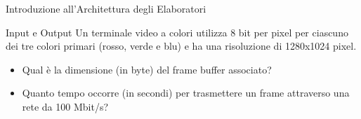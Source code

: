 \documentclass[11pt]{article}
\begin{document}
\begin{quiz}{Introduzione all'Architettura degli Elaboratori}
\begin{cloze}[points=1,shuffle=false]{Input e Output}
Un terminale video a colori utilizza 8 bit per pixel per ciascuno dei tre colori primari (rosso, verde e blu) e ha una risoluzione di 1280x1024 pixel.
\begin{itemize}
    \item Qual è la dimensione (in byte) del frame buffer associato? 
    \item Quanto tempo occorre (in secondi) per trasmettere un frame attraverso una rete da 100 Mbit/s?
\end{itemize}
\end{cloze}


\end{quiz}
\end{document}
